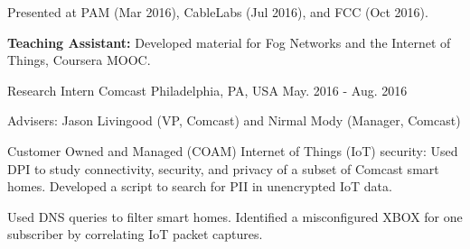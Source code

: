 \begin{cventries}
{\begin{cvitems}
{      		}
      \item {Presented at PAM (Mar 2016), CableLabs (Jul 2016), and FCC (Oct 2016).
      		}
%
      \item {\textbf{Teaching Assistant:} Developed material for Fog Networks and the Internet of Things, Coursera MOOC.
      		}
      \end{cvitems}
    }

  \cventry
    {Research Intern} %
    {Comcast} %
    {Philadelphia, PA, USA} %
    {May. 2016 - Aug. 2016} %
    {
      \begin{cvitems} %
      \item {Advisers: Jason Livingood (VP, Comcast) and Nirmal Mody (Manager, Comcast)}
%      
      \item {Customer Owned and Managed (COAM) Internet of Things (IoT) security: Used DPI to study connectivity, security, and privacy of a subset of Comcast smart homes. Developed a script to search for PII in unencrypted IoT data.}
      \item {Used DNS queries to filter smart homes. Identified a misconfigured XBOX for one subscriber by correlating IoT packet captures.}
%      
      \end{cvitems}
    }


\end{cventries}
